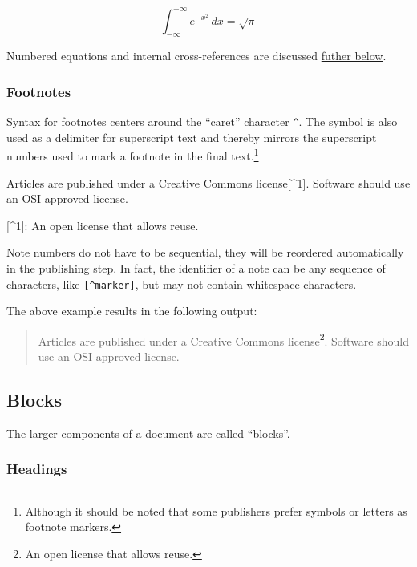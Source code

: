 \documentclass[10pt,a4paper,onecolumn]{article}
\newenvironment{Shaded}{}{}
\newcommand{\NormalTok}[1]{#1}
\newcommand{\OtherTok}[1]{\textcolor[rgb]{0.00,0.44,0.13}{#1}}
\begin{document}
\[\int_{-\infty}^{+\infty} e^{-x^2} \, dx = \sqrt{\pi}\]

Numbered equations and internal cross-references are discussed
\hyperref[equations]{futher below}.

\subsubsection{Footnotes}\label{footnotes}

Syntax for footnotes centers around the ``caret'' character
\texttt{\^{}}. The symbol is also used as a delimiter for superscript
text and thereby mirrors the superscript numbers used to mark a footnote
in the final text.\footnote{Although it should be noted that some
  publishers prefer symbols or letters as footnote markers.}

\begin{Shaded}
\begin{Highlighting}[]
\NormalTok{Articles are published under a Creative Commons license}\OtherTok{[\^{}1]}\NormalTok{.}
\NormalTok{Software should use an OSI{-}approved license.}

\OtherTok{[\^{}1]: }\NormalTok{An open license that allows reuse.}
\end{Highlighting}
\end{Shaded}

Note numbers do not have to be sequential, they will be reordered
automatically in the publishing step. In fact, the identifier of a note
can be any sequence of characters, like \texttt{{[}\^{}marker{]}}, but
may not contain whitespace characters.

The above example results in the following output:

\begin{quote}
Articles are published under a Creative Commons license\footnote{An open
  license that allows reuse.}. Software should use an OSI-approved
license.
\end{quote}

\subsection{Blocks}\label{blocks}

The larger components of a document are called ``blocks''.

\subsubsection{Headings}\label{headings}
\end{document}
